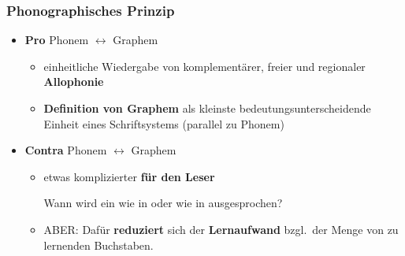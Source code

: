 \begin{frame}
\frametitle{Phonographisches Prinzip}

\begin{itemize}
	\item \textbf{Pro} Phonem $\leftrightarrow$ Graphem
	
	\begin{itemize}
		\item einheitliche Wiedergabe von komplementärer, freier und regionaler \textbf{Allophonie}

		\item \textbf{Definition von Graphem} als kleinste bedeutungsunterscheidende Einheit eines Schriftsystems (parallel zu Phonem)
	\end{itemize}

\pause 
	
	\item \textbf{Contra} Phonem $\leftrightarrow$ Graphem
	
	\begin{itemize}
		\item etwas komplizierter \textbf{für den Leser}
		
		\ea Wann wird ein  wie in  oder wie in  ausgesprochen?
		\z 
		
		\item ABER: Dafür \textbf{reduziert} sich der \textbf{Lernaufwand} bzgl.\ der Menge von zu lernenden Buchstaben.	
	\end{itemize}
\end{itemize}

\end{frame}


